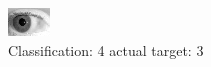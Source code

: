 \begin{figure}[h!]
\begin{center}
\includegraphics[width=0.60\columnwidth]{figures/ID245_class_4_target_3.png}
\end{center}
\caption{ Classification: 4 actual target: 3}
\label{fig:ID245_class_4_target_3}
\end{figure}
